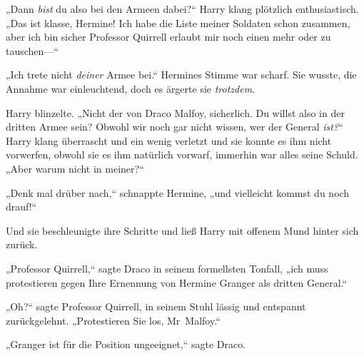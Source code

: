 „Dann \emph{bist} du also bei den Armeen dabei?“ Harry klang plötzlich enthusiastisch. „Das ist klasse, Hermine! Ich habe die Liste meiner Soldaten schon zusammen, aber ich bin sicher Professor Quirrell erlaubt mir noch einen mehr oder zu tauschen—“

„Ich trete nicht \emph{deiner} Armee bei.“ Hermines Stimme war scharf. Sie wusste, die Annahme war einleuchtend, doch es ärgerte sie \emph{trotzdem}.

Harry blinzelte. „Nicht der von Draco Malfoy, sicherlich. Du willst also in der dritten Armee sein? Obwohl wir noch gar nicht wissen, wer der General \emph{ist?}“ Harry klang überrascht und ein wenig verletzt und sie konnte es ihm nicht vorwerfen, obwohl sie es ihm natürlich vorwarf, immerhin war alles seine Schuld. „Aber warum nicht in meiner?“

„Denk mal drüber nach,“ schnappte Hermine, „und vielleicht kommst du noch drauf!“

Und sie beschleunigte ihre Schritte und ließ Harry mit offenem Mund hinter sich zurück.

\later

„Professor Quirrell,“ sagte Draco in seinem formellsten Tonfall, „ich muss protestieren gegen Ihre Ernennung von Hermine Granger als dritten General.“

„Oh?“ sagte Professor Quirrell, in seinem Stuhl lässig und entspannt zurückgelehnt. „Protestieren Sie los, Mr~Malfoy.“

„Granger ist für die Position ungeeignet,“ sagte Draco.

